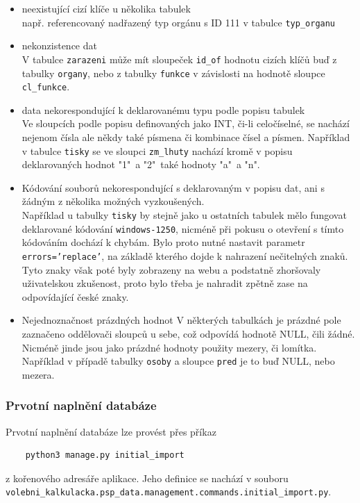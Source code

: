 \begin{itemize}
    \item neexistující cizí klíče u několika tabulek\\
    např. referencovaný nadřazený typ orgánu s ID 111 v tabulce \texttt{typ\_organu}
    \item nekonzistence dat\\
    V tabulce \texttt{zarazeni} může mít sloupeček \texttt{id\_of} hodnotu cizích klíčů buď z tabulky \texttt{organy}, nebo z tabulky \texttt{funkce} v závislosti na hodnotě sloupce \texttt{cl\_funkce}.
    \item data nekorespondující k deklarovanému typu podle popisu tabulek\\
    Ve sloupcích podle popisu definovaných jako INT, či-li celočíselné, se nachází nejenom čísla ale někdy také písmena či kombinace čísel a písmen. Například v tabulce \texttt{tisky} se ve sloupci \texttt{zm\_lhuty} nachází kromě v popisu deklarovaných hodnot "1"\ a "2"\ také hodnoty "a"\ a "n".
    \item Kódování souborů nekorespondující s deklarovaným v popisu dat, ani s žádným z několika možných vyzkoušených.\\
    Například u tabulky \texttt{tisky} by stejně jako u ostatních tabulek mělo fungovat deklarované kódování \texttt{windows-1250}, nicméně při pokusu o otevření s tímto kódováním dochází k chybám. Bylo proto nutné nastavit parametr \texttt{errors='replace'}, na základě kterého dojde k nahrazení nečitelných znaků. Tyto znaky však poté byly zobrazeny na webu a podstatně zhoršovaly uživatelskou zkušenost, proto bylo třeba je nahradit zpětně zase na odpovídající české znaky.
    \item Nejednoznačnost prázdných hodnot
    V některých tabulkách je prázdné pole zaznačeno oddělovači sloupců u sebe, což odpovídá hodnotě NULL, čili žádné. Nicméně jinde jsou jako prázdné hodnoty použity mezery, či lomítka. Například v případě tabulky \texttt{osoby} a sloupce \texttt{pred} je to buď NULL, nebo mezera.
    
    
\end{itemize}

\subsubsection{Prvotní naplnění databáze}
Prvotní naplnění databáze lze provést přes příkaz
\begin{verbatim}
    python3 manage.py initial_import
\end{verbatim}
z kořenového adresáře aplikace. Jeho definice se nachází v souboru\\
\texttt{volebni\_kalkulacka.psp\_data.management.commands.initial\_import.py}. \\


